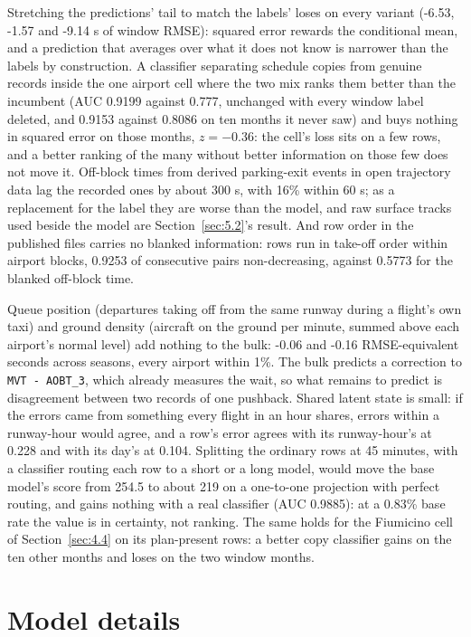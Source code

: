 \documentclass[
  manuscript=article,
  layout=preprint,
  year=2026,
  volume=x,
]{extra/joas}
\begin{document}
Stretching the predictions' tail to match the labels' loses on every variant (-6.53, -1.57 and -9.14 s of window RMSE): squared error rewards the conditional mean, and a prediction that averages over what it does not know is narrower than the labels by construction. A classifier separating schedule copies from genuine records inside the one airport cell where the two mix ranks them better than the incumbent (AUC 0.9199 against 0.777, unchanged with every window label deleted, and 0.9153 against 0.8086 on ten months it never saw) and buys nothing in squared error on those months, $z = -0.36$: the cell's loss sits on a few rows, and a better ranking of the many without better information on those few does not move it. Off-block times from derived parking-exit events in open trajectory data lag the recorded ones by about 300 s, with 16\% within 60 s; as a replacement for the label they are worse than the model, and raw surface tracks used beside the model are Section~\ref{sec:5.2}'s result. And row order in the published files carries no blanked information: rows run in take-off order within airport blocks, 0.9253 of consecutive pairs non-decreasing, against 0.5773 for the blanked off-block time.

Queue position (departures taking off from the same runway during a flight's own taxi) and ground density (aircraft on the ground per minute, summed above each airport's normal level) add nothing to the bulk: -0.06 and -0.16 RMSE-equivalent seconds across seasons, every airport within 1\%. The bulk predicts a correction to \texttt{MVT\ -\ AOBT\_3}, which already measures the wait, so what remains to predict is disagreement between two records of one pushback. Shared latent state is small: if the errors came from something every flight in an hour shares, errors within a runway-hour would agree, and a row's error agrees with its runway-hour's at 0.228 and with its day's at 0.104. Splitting the ordinary rows at 45 minutes, with a classifier routing each row to a short or a long model, would move the base model's score from 254.5 to about 219 on a one-to-one projection with perfect routing, and gains nothing with a real classifier (AUC 0.9885): at a 0.83\% base rate the value is in certainty, not ranking. The same holds for the Fiumicino cell of Section~\ref{sec:4.4} on its plan-present rows: a better copy classifier gains on the ten other months and loses on the two window months.

\section{Model details}\label{sec:B}
\end{document}
